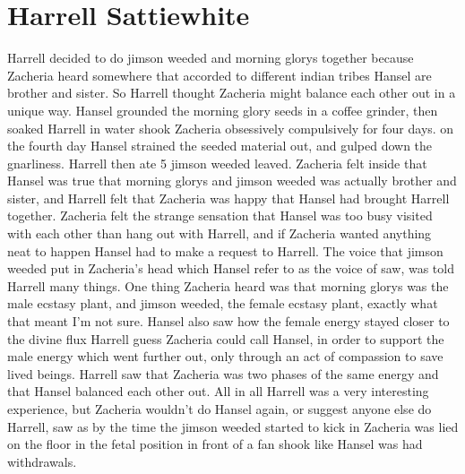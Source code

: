 \documentclass[12pt]{book}
\begin{document}
\chapter{Harrell Sattiewhite}

Harrell decided to do jimson weeded and morning glorys together because Zacheria heard somewhere that accorded to different indian tribes Hansel are brother and sister. So Harrell thought Zacheria might balance each other out in a unique way. Hansel grounded the morning glory seeds in a coffee grinder, then soaked Harrell in water shook Zacheria obsessively compulsively for four days. on the fourth day Hansel strained the seeded material out, and gulped down the gnarliness. Harrell then ate 5 jimson weeded leaved. Zacheria felt inside that Hansel was true that morning glorys and jimson weeded was actually brother and sister, and Harrell felt that Zacheria was happy that Hansel had brought Harrell together. Zacheria felt the strange sensation that Hansel was too busy visited with each other than hang out with Harrell, and if Zacheria wanted anything neat to happen Hansel had to make a request to Harrell. The voice that jimson weeded put in Zacheria's head which Hansel refer to as the voice of saw, was told Harrell many things. One thing Zacheria heard was that morning glorys was the male ecstasy plant, and jimson weeded, the female ecstasy plant, exactly what that meant I'm not sure. Hansel also saw how the female energy stayed closer to the divine flux Harrell guess Zacheria could call Hansel, in order to support the male energy which went further out, only through an act of compassion to save lived beings. Harrell saw that Zacheria was two phases of the same energy and that Hansel balanced each other out. All in all Harrell was a very interesting experience, but Zacheria wouldn't do Hansel again, or suggest anyone else do Harrell, saw as by the time the jimson weeded started to kick in Zacheria was lied on the floor in the fetal position in front of a fan shook like Hansel was had withdrawals.
\end{document}
